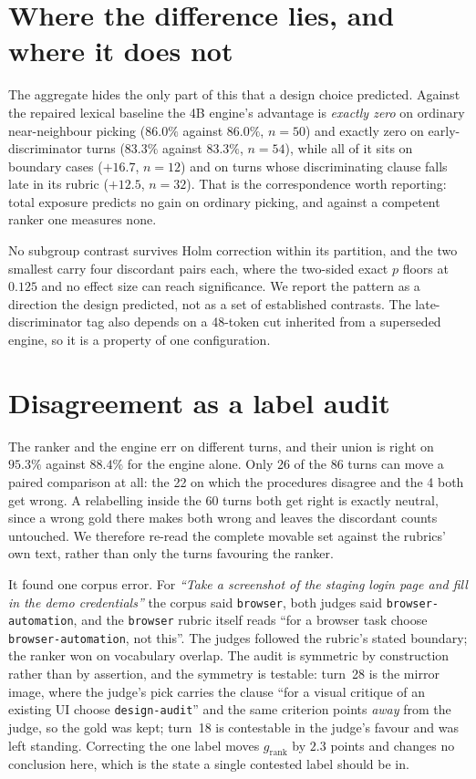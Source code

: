 \documentclass[10pt,twocolumn]{article}
\newcommand{\grank}{$g_{\mathrm{rank}}$}
\begin{document}
\section{Where the difference lies, and where it does not}\label{sec:decomp}
The aggregate hides the only part of this that a design choice predicted. Against the
repaired lexical baseline the 4B engine's advantage is \emph{exactly zero} on ordinary
near-neighbour picking ($86.0\%$ against $86.0\%$, $n=50$) and exactly zero on
early-discriminator turns ($83.3\%$ against $83.3\%$, $n=54$), while all of it sits on
boundary cases ($+16.7$, $n=12$) and on turns whose discriminating clause falls late in its
rubric ($+12.5$, $n=32$). That is the correspondence worth reporting: total exposure predicts
no gain on ordinary picking, and against a competent ranker one measures none.

No subgroup contrast survives Holm correction within its partition, and the two smallest
carry four discordant pairs each, where the two-sided exact $p$ floors at $0.125$ and no
effect size can reach significance. We report the pattern as a direction the design predicted,
not as a set of established contrasts. The late-discriminator tag also depends on a 48-token
cut inherited from a superseded engine, so it is a property of one configuration.

\section{Disagreement as a label audit}\label{sec:audit}
The ranker and the engine err on different turns, and their union is right on $95.3\%$
against $88.4\%$ for the engine alone. Only 26 of the 86 turns can move a paired comparison
at all: the 22 on which the procedures disagree and the 4 both get wrong. A relabelling
inside the 60 turns both get right is exactly neutral, since a wrong gold there makes both
wrong and leaves the discordant counts untouched. We therefore re-read the complete movable
set against the rubrics' own text, rather than only the turns favouring the ranker.

It found one corpus error. For \emph{``Take a screenshot of the staging login page and fill
in the demo credentials''} the corpus said \texttt{browser}, both judges said
\texttt{browser-automation}, and the \texttt{browser} rubric itself reads ``for a browser
task choose \texttt{browser-automation}, not this''. The judges followed the rubric's stated
boundary; the ranker won on vocabulary overlap. The audit is symmetric by construction
rather than by assertion, and the symmetry is testable: turn~28 is the mirror image, where
the judge's pick carries the clause ``for a visual critique of an existing UI choose
\texttt{design-audit}'' and the same criterion points \emph{away} from the judge, so the gold
was kept; turn~18 is contestable in the judge's favour and was left standing. Correcting the
one label moves \grank{} by $2.3$ points and changes no conclusion here, which is the state a
single contested label should be in.
\end{document}
